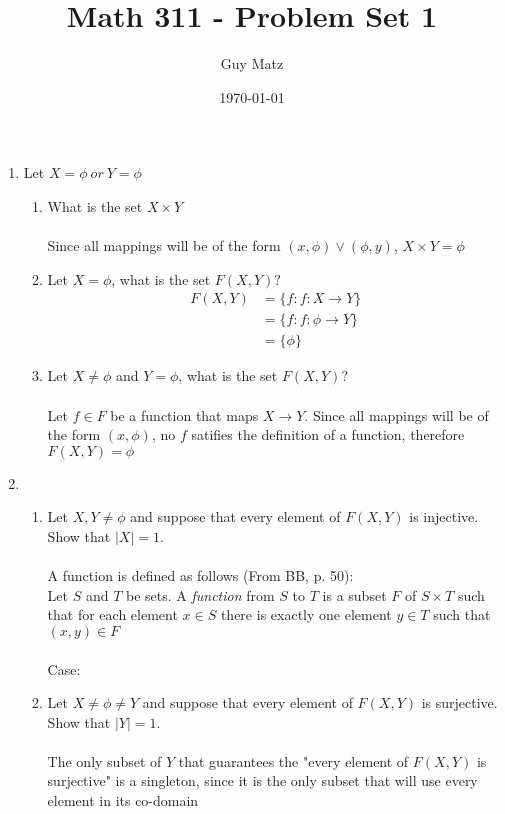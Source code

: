 \documentclass[11pt]{article}
\title{\textbf{Math 311 - Problem Set 1}}
\author{Guy Matz}
\date{\today}
\begin{document}
\maketitle

\newpage

\begin{enumerate}  %
\item Let $X = \phi \ or \ Y = \phi$

\begin{enumerate} %
\item What is the set $X \times Y$\\ \\
Since all mappings will be of the form $(x,\phi) \vee (\phi,y)$, $X \times Y = \phi$\\
\item Let $X = \phi$, what is the set $F(X,Y)?$
\begin{align*}
F(X,Y) &= \{f: f:X \to Y\}
\\     &= \{f: f:\phi \to Y\}
\\     &= \{ \phi \}
\end{align*}

\item Let $X \neq \phi$ and $Y = \phi$, what is the set $F(X,Y)?$\\ \\
Let $f \in F$ be a function that maps $X \to Y$.  Since all mappings will be of the form $(x,\phi)$, no $f$ satifies the definition of a function, therefore $F(X,Y) = \phi$  
\end{enumerate} %

\newpage

\item

\begin{enumerate} %
\item Let $X, Y \neq \phi$ and suppose that every element of $F(X,Y)$ is injective.  Show that $|X| = 1$.
\\ \\
A function is defined as follows (From BB, p. 50):\\
Let $S$ and $T$ be sets. A \emph{function} from $S$ to $T$ is a subset $F$ of $S \times T$ such that for each element $x \in S$ there is exactly one element  $y \in T$ such that $(x,y) \in F$
\\ \\
Case: 
\\
\item Let $X \neq \phi \neq Y$ and suppose that every element of $F(X,Y)$ is surjective.  Show that $|Y| = 1$.
\\ \\
The only subset of $Y$ that guarantees the "every element of $F(X,Y)$ is surjective" is a singleton, since it is the only subset that will use every element in its co-domain
\\


\end{enumerate}
\end{enumerate}
\end{document}
